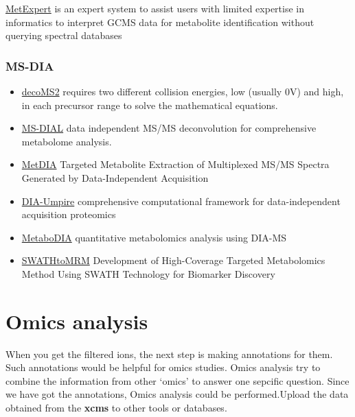 \documentclass[
]{book}
\begin{document}
\href{https://sourceforge.net/projects/metexpert/}{MetExpert} is an expert system to assist users with limited expertise in informatics to interpret GCMS data for metabolite identification without querying spectral databases\citep{qiu2018}

\hypertarget{ms-dia}{%
\subsection{MS-DIA}\label{ms-dia}}

\begin{itemize}
\item
  \href{https://pubs.acs.org/doi/10.1021/ac400751j}{decoMS2} requires two different collision energies, low (usually 0V) and high, in each precursor range to solve the mathematical equations.\citep{nikolskiy2013}
\item
  \href{http://prime.psc.riken.jp/Metabolomics_Software/MS-DIAL/}{MS-DIAL} data independent MS/MS deconvolution for comprehensive metabolome analysis.\citep{tsugawa2015}
\item
  \href{https://pubs.acs.org/doi/abs/10.1021/acs.analchem.6b02122}{MetDIA} Targeted Metabolite Extraction of Multiplexed MS/MS Spectra Generated by Data-Independent Acquisition\citep{li2016c}
\item
  \href{https://www.nature.com/articles/nmeth.3255}{DIA-Umpire} comprehensive computational framework for data-independent acquisition proteomics\citep{tsou2015}
\item
  \href{https://sourceforge.net/projects/metabodia/}{MetaboDIA} quantitative metabolomics analysis using DIA-MS\citep{chen2017a}
\item
  \href{https://pubs.acs.org/doi/10.1021/acs.analchem.7b05318}{SWATHtoMRM} Development of High-Coverage Targeted Metabolomics Method Using SWATH Technology for Biomarker Discovery\citep{zha2018}
\end{itemize}

\hypertarget{omics-analysis}{%
\chapter{Omics analysis}\label{omics-analysis}}

When you get the filtered ions, the next step is making annotations for them. Such annotations would be helpful for omics studies. Omics analysis try to combine the information from other `omics' to answer one sepcific question. Since we have got the annotations, Omics analysis could be performed.Upload the data obtained from the \textbf{xcms} to other tools or databases.
\end{document}
